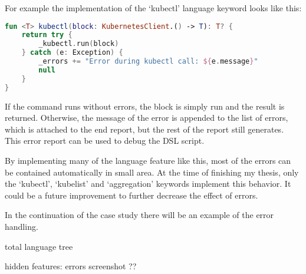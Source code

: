 For example the implementation of the `kubectl' language keyword looks like this:

\begin{lstlisting}[caption={kubectl error handling implementation},language=Kotlin,label=code:error_handling]
fun <T> kubectl(block: KubernetesClient.() -> T): T? {
    return try {
        _kubectl.run(block)
    } catch (e: Exception) {
        _errors += "Error during kubectl call: ${e.message}"
        null
    }
}
\end{lstlisting}

If the command runs without errors, the block is simply run and the result is returned. Otherwise, the message of the error is appended to the list of errors, which is attached to the end report, but the rest of the report still generates. This error report can be used to debug the DSL script.

By implementing many of the language feature like this, most of the errors can be contained automatically in small area. At the time of finishing my thesis, only the `kubectl', `kubelist' and `aggregation' keywords implement this behavior. It could be a future improvement to further decrease the effect of errors.

In the continuation of the case study there will be an example of the error handling.

total language tree

hidden features:
    errors 
    screenshot ??
